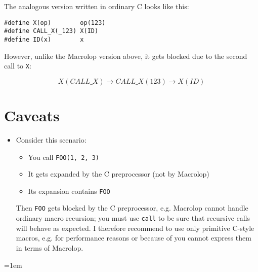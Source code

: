 \documentclass[12pt]{article}
\theoremstyle{break}
\begin{document}
The analogous version written in ordinary C looks like this:

\begin{verbatim}
#define X(op)        op(123)
#define CALL_X(_123) X(ID)
#define ID(x)        x
\end{verbatim}

However, unlike the Macrolop version above, it gets blocked due to the
second call to \texttt{X}:

$$
X(CALL\_X) \to CALL\_X(123) \to X(ID)
$$

\section{Caveats}

\begin{itemize}
\item Consider this scenario:
    \begin{itemize}
        \item You call \texttt{FOO(1, 2, 3)}
        \item It gets expanded by the C preprocessor (not by Macrolop)
        \item Its expansion contains \texttt{FOO}
    \end{itemize}
Then \texttt{FOO} gets blocked by the C preprocessor, e.g. Macrolop cannot handle ordinary
macro recursion; you must use \texttt{call} to be sure that recursive calls
will behave as expected. I therefore recommend to use only primitive C-style macros, e.g.
for performance reasons or because of you cannot express them in terms of Macrolop.
\end{itemize}

\emergencystretch=1em
\printbibliography
\end{document}

